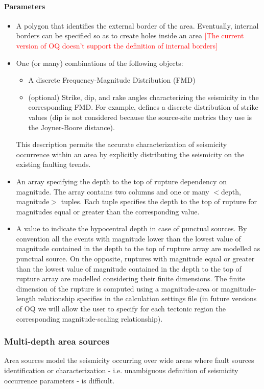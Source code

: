 \paragraph{Parameters}
\begin{itemize}
\item A polygon that identifies the external border of the area. Eventually, 
internal borders can be specified so as to create holes inside an area
	\textcolor{red}{[The current version of OQ doesn't support the definition 
	of internal borders]}
\item One (or many) combinations of the following objects:
\begin{itemize}
	\item A discrete Frequency-Magnitude Distribution (FMD)
	\item (optional) Strike, dip, and rake angles characterizing the seismicity  
	in the corresponding FMD.
	For example, \cite{coppersmith2009} defines a discrete distribution of 
	strike values (dip is not considered because the source-site metrics they 
	use is the Joyner-Boore distance). 
\end{itemize}
This description permits the accurate characterization of seismicity occurrence 
within an area by explicitly distributing the seismicity on the existing 
faulting trends. 
\item An array specifying the depth to the top of rupture dependency on 
magnitude. The array contains two columns and one or many $<$depth, magnitude$>$ 
tuples. Each tuple specifies the depth to the top of rupture for magnitudes 
equal or greater than the corresponding value. 
\item A value to indicate the hypocentral depth in case of punctual sources. 
By convention all the events with magnitude lower than the lowest value of 
magnitude contained in the depth to the top of rupture array are modelled as 
punctual source. On the opposite, ruptures with magnitude equal or greater than 
the lowest value of magnitude contained in the depth to the top of rupture array 
are modelled considering their finite dimensions. The finite dimension of the 
rupture is computed using a magnitude-area or magnitude-length relationship 
specifies in the calculation settings file (in future versions of OQ we will 
allow the user to specify for each tectonic region the corresponding 
magnitude-scaling relationship).
\end{itemize}
%
\subsubsection{Multi-depth area sources}
\label{hazard:seismic_source_types:multiDepthAreaSources}
Area sources model the seismicity occurring over wide areas where fault 
sources identification or characterization - i.e. unambiguous definition 
of seismicity occurrence parameters - is difficult. 

